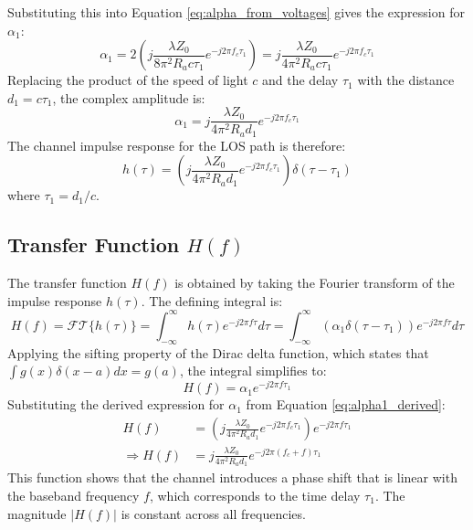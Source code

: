 Substituting this into Equation \ref{eq:alpha_from_voltages} gives the expression for $\alpha_1$:
\begin{equation}
	\alpha_1 = 2 \left( j \frac{\lambda Z_0}{8\pi^2 R_a c\tau_1} e^{-j2\pi f_c \tau_1} \right) = j \frac{\lambda Z_0}{4\pi^2 R_a c\tau_1} e^{-j2\pi f_c \tau_1}
\end{equation}
Replacing the product of the speed of light $c$ and the delay $\tau_1$ with the distance $d_1 = c\tau_1$, the complex amplitude is:
\begin{equation}
	\alpha_1 = j \frac{\lambda Z_0}{4\pi^2 R_a d_1} e^{-j2\pi f_c \tau_1}
	\label{eq:alpha1_derived}
\end{equation}
The channel impulse response for the LOS path is therefore:
\begin{equation}
	h(\tau) = \left( j \frac{\lambda Z_0}{4\pi^2 R_a d_1} e^{-j2\pi f_c \tau_1} \right) \delta(\tau - \tau_1)
	\label{eq:los_impulse_response_derived_detailed}
\end{equation}
where $\tau_1 = d_1/c$.

\subsection{Transfer Function $H(f)$}
The transfer function $H(f)$ is obtained by taking the Fourier transform of the impulse response $h(\tau)$. The defining integral is:
\begin{equation}
	H(f) = \mathcal{FT}\{ h(\tau)\} =  \int_{-\infty}^{\infty} h(\tau) e^{-j2\pi f \tau} d\tau = \int_{-\infty}^{\infty} \left( \alpha_1 \delta(\tau - \tau_1) \right) e^{-j2\pi f \tau} d\tau
\end{equation}
Applying the sifting property of the Dirac delta function, which states that $\int g(x)\delta(x-a)dx = g(a)$, the integral simplifies to:
\begin{equation}
	H(f) = \alpha_1 e^{-j2\pi f \tau_1}
\end{equation}
Substituting the derived expression for $\alpha_1$ from Equation \ref{eq:alpha1_derived}:
\begin{align}
	H(f) &= \left( j \frac{\lambda Z_0}{4\pi^2 R_a d_1} e^{-j2\pi f_c \tau_1} \right) e^{-j2\pi f \tau_1} \\
	\Rightarrow H(f) &= j \frac{\lambda Z_0}{4\pi^2 R_a d_1} e^{-j2\pi (f_c + f) \tau_1}
	\label{eq:los_transfer_function_detailed}
\end{align}
This function shows that the channel introduces a phase shift that is linear with the baseband frequency $f$, which corresponds to the time delay $\tau_1$. The magnitude $|H(f)|$ is constant across all frequencies.

